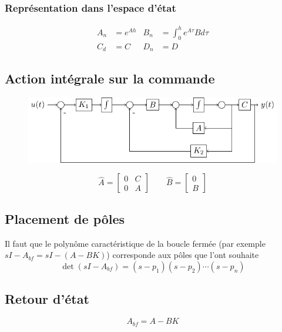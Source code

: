 \documentclass[resume]{subfiles}
\begin{document}
\subsubsection{Représentation dans l'espace d'état}
$$\boxed{\begin{split}
A_n&=e^{Ah} & B_n&=\int_{0}^{h}e^{A\tau}Bd\tau\\
C_d&=C & D_n &= D
\end{split}}$$



\subsection{Action intégrale sur la commande}
\begin{figure}[H]
\centering
\includegraphics[width=\columnwidth]{drwg_2.pdf}
\end{figure}
$$\hat{A}=\begin{bmatrix}0 & C\\0 & A\end{bmatrix}\qquad \hat{B}=\begin{bmatrix}0\\B\end{bmatrix}$$


\subsection{Placement de pôles}
Il faut que le polynôme caractéristique de la boucle fermée (par exemple $sI-A_{bf}=sI-(A-BK)$) corresponde aux pôles que l'ont souhaite
$$\det(sI-A_{bf})=(s-p_1)(s-p_2)\cdots(s-p_n)$$

\subsection{Retour d'état}
$$A_{bf}=A-BK$$
\end{document}
